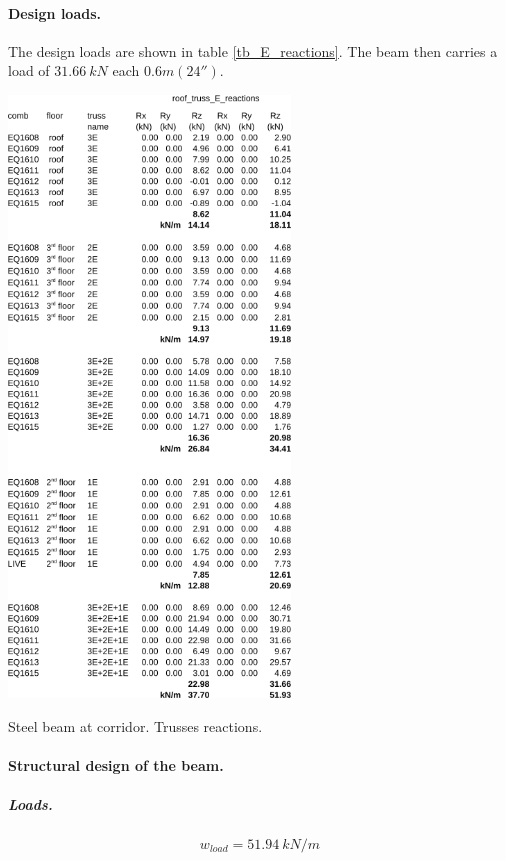 \paragraph{Design loads.}
The design loads are shown in table \ref{tb_E_reactions}. The beam then carries a load of $31.66\ kN$ each $0.6 m (24'')$. 

\begin{table}
  \begin{center}
  \includegraphics[width=75mm]{figures/E_reactions}
  \end{center}
  \caption{Steel beam at corridor. Trusses reactions.}\label{tb_E_reactions}
\end{table}

\paragraph{Structural design of the beam.}

\subparagraph{Loads.}

\begin{equation}
  w_{load}= 51.94\ kN/m
\end{equation}

